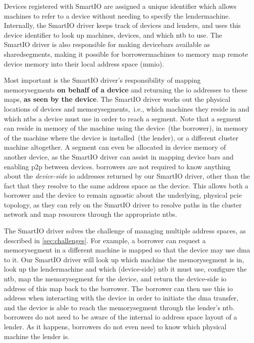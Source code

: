Devices registered with SmartIO are assigned a unique identifier which allows machines to refer to a device without needing to specify the \gls{lendermachine}.
%
Internally, the SmartIO driver keeps track of devices and \glspl{lender}, and uses this device identifier to look up machines, devices, and which \gls{ntb} to use.
%
The SmartIO driver is also responsible for making \glspl{devicebar} available as \glspl{sharedsegment}, making it possible for \glspl{borrowermachine} to memory map remote device memory into their local address space (\gls{mmio}).



Most important is the SmartIO driver's responsibility of mapping \glspl{memorysegment} \textbf{on behalf of a device} and returning the \gls{io} addresses to these maps, \textbf{as seen by the device}.
%
The SmartIO driver works out the physical locations of devices and \glspl{memorysegment},~i.e., which machines they reside in and which \glspl{ntb} a device must use in order to reach a \gls{segment}.
%
Note that a \gls{segment} can reside in memory of the machine using the device~(the \gls{borrower}), in memory of the machine where the device is installed~(the \gls{lender}), or a different cluster machine altogether.
%
A segment can even be allocated in device memory of another device, as the SmartIO driver can assist in mapping device \glspl{bar} and enabling \gls{p2p} between devices.
%
\Glspl{borrower} are not required to know anything about the \emph{device-side} \gls{io} addresses returned by our SmartIO driver, other than the fact that they resolve to the same address space as the device.
%
This allows both a \gls{borrower} and the device to remain agnostic about the underlying, physical \gls{pcie} topology, as they can rely on the SmartIO driver to resolve paths in the cluster network and map resources through the appropriate \glspl{ntb}.



The SmartIO driver solves the challenge of managing multiple address spaces, as described in \cref{sec:challenges}.
%
For example, a \gls{borrower} can request a \gls{memorysegment} in a different machine is mapped so that the device may use \gls{dma} to it.
%
Our SmartIO driver will look up which machine the \gls{memorysegment} is in, look up the \gls{lendermachine} and which (device-side) \gls{ntb} it must use, configure the \gls{ntb}, map the \gls{memorysegment} for the device, and return the device-side \gls{io} address of this map back to the \gls{borrower}.
%
The \gls{borrower} can then use this \gls{io} address when interacting with the device in order to initiate the \gls{dma} transfer, and the device is able to reach the \gls{memorysegment} through the lender's \gls{ntb}.
%
\Glspl{borrower} do not need to be aware of the internal \gls{io} address space layout of a \gls{lender}.
%
As it happens, \glspl{borrower} do not even need to know which physical machine the \gls{lender} is.



